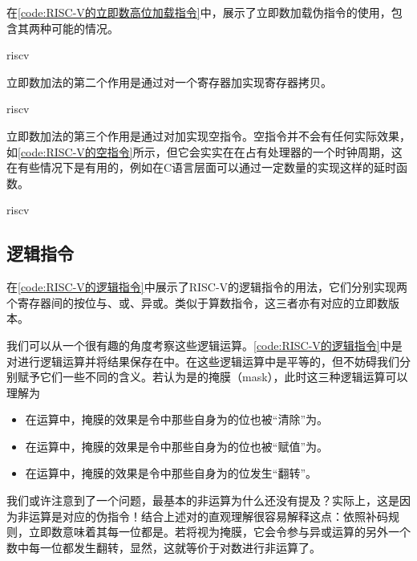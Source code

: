在\cref{code:RISC-V的立即数高位加载指令}中，展示了立即数加载伪指令的使用，包含其两种可能的情况。
\begin{Code}{riscv}
    
\end{Code}

立即数加法的第二个作用是通过对一个寄存器加实现寄存器拷贝。
\begin{Code}{riscv}
    
\end{Code}

立即数加法的第三个作用是通过对加实现空指令。空指令并不会有任何实际效果，如\cref{code:RISC-V的空指令}所示，但它会实实在在占有处理器的一个时钟周期，这在有些情况下是有用的，例如在C语言层面可以通过一定数量的实现这样的延时函数。
\begin{Code}{riscv}
    
\end{Code}

\subsection{逻辑指令}

在\cref{code:RISC-V的逻辑指令}中展示了RISC-V的逻辑指令的用法，它们分别实现两个寄存器间的按位与、或、异或。类似于算数指令，这三者亦有对应的立即数版本。

我们可以从一个很有趣的角度考察这些逻辑运算。\cref{code:RISC-V的逻辑指令}中是对进行逻辑运算并将结果保存在中。在这些逻辑运算中是平等的，但不妨碍我们分别赋予它们一些不同的含义。若认为是的掩膜（mask），此时这三种逻辑运算可以理解为
\begin{itemize}
    \item 在运算中，掩膜的效果是令中那些自身为的位也被“清除”为。
    \item 在运算中，掩膜的效果是令中那些自身为的位也被“赋值”为。
    \item 在运算中，掩膜的效果是令中那些自身为的位发生“翻转”。
\end{itemize}

我们或许注意到了一个问题，最基本的非运算为什么还没有提及？实际上，这是因为非运算是对应的伪指令！结合上述对的直观理解很容易解释这点：依照补码规则，立即数意味着其每一位都是。若将视为掩膜，它会令参与异或运算的另外一个数中每一位都发生翻转，显然，这就等价于对数进行非运算了。

